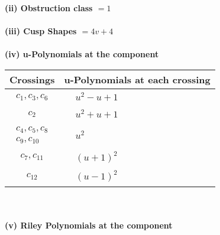 \documentclass[1p]{elsarticle_modified}
\theoremstyle{definition}
\begin{document}
\flushleft \textbf{(ii) Obstruction class $= 1$}\\~\\
\flushleft \textbf{(iii) Cusp Shapes $= 4 v+4$}\\~\\
\newpage\renewcommand{\arraystretch}{1}
\flushleft \textbf{(iv) u-Polynomials at the component}\newline \\
\begin{tabular}{m{50pt}|m{274pt}}
Crossings & \hspace{64pt}u-Polynomials at each crossing \\
\hline $$\begin{aligned}c_{1},c_{3},c_{6}\end{aligned}$$&$\begin{aligned}
&u^2- u+1
\end{aligned}$\\
\hline $$\begin{aligned}c_{2}\end{aligned}$$&$\begin{aligned}
&u^2+u+1
\end{aligned}$\\
\hline $$\begin{aligned}c_{4},c_{5},c_{8}\\c_{9},c_{10}\end{aligned}$$&$\begin{aligned}
&u^2
\end{aligned}$\\
\hline $$\begin{aligned}c_{7},c_{11}\end{aligned}$$&$\begin{aligned}
&(u+1)^2
\end{aligned}$\\
\hline $$\begin{aligned}c_{12}\end{aligned}$$&$\begin{aligned}
&(u-1)^2
\end{aligned}$\\
\hline
\end{tabular}\\~\\
\newpage\renewcommand{\arraystretch}{1}
\flushleft \textbf{(v) Riley Polynomials at the component}\newline \\
\end{document}
